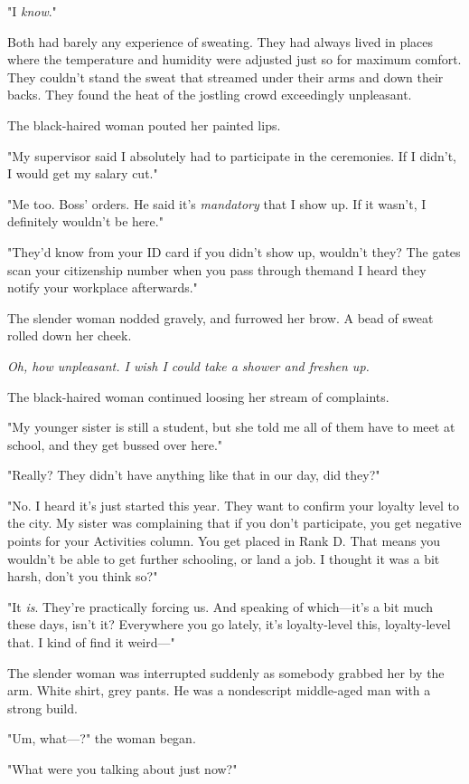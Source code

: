 "I \emph{know}."

Both had barely any experience of sweating. They had always lived in
places where the temperature and humidity were adjusted just so for
maximum comfort. They couldn't stand the sweat that streamed under their
arms and down their backs. They found the heat of the jostling crowd
exceedingly unpleasant.

The black-haired woman pouted her painted lips.

"My supervisor said I absolutely had to participate in the ceremonies.
If I didn't, I would get my salary cut."

"Me too. Boss' orders. He said it's \emph{mandatory} that I show up. If it
wasn't, I definitely wouldn't be here."

"They'd know from your ID card if you didn't show up, wouldn't they? The
gates scan your citizenship number when you pass through them\el and I
heard they notify your workplace afterwards."

The slender woman nodded gravely, and furrowed her brow. A bead of sweat
rolled down her cheek.

\emph{Oh, how unpleasant. I wish I could take a shower and freshen up.}

The black-haired woman continued loosing her stream of complaints.

"My younger sister is still a student, but she told me all of them have
to meet at school, and they get bussed over here."

"Really? They didn't have anything like that in our day, did they?"

"No. I heard it's just started this year. They want to confirm your
loyalty level to the city. My sister was complaining that if you don't
participate, you get negative points for your Activities column. You get
placed in Rank D. That means you wouldn't be able to get further
schooling, or land a job. I thought it was a bit harsh, don't you think
so?"

"It \emph{is}. They're practically forcing us. And speaking of which---it's a bit
much these days, isn't it? Everywhere you go lately, it's loyalty-level
this, loyalty-level that. I kind of find it weird---"

The slender woman was interrupted suddenly as somebody grabbed her by
the arm. White shirt, grey pants. He was a nondescript middle-aged man
with a strong build.

"Um, what---?" the woman began.

"What were you talking about just now?"

